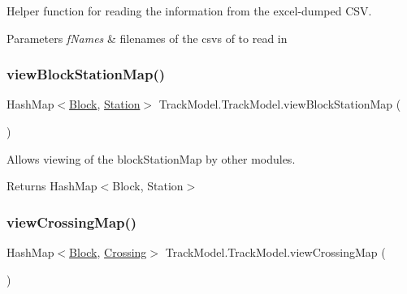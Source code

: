 Helper function for reading the information from the excel-\/dumped C\+SV. 


\begin{DoxyParams}{Parameters}
{\em f\+Names} & filenames of the csv\textquotesingle{}s of to read in \\
\hline
\end{DoxyParams}
\mbox{\label{classTrackModel_1_1TrackModel_a5bd341c8df3e0ad585f32e1587061f36}} 
\subsubsection{\texorpdfstring{view\+Block\+Station\+Map()}{viewBlockStationMap()}}
{\footnotesize\ttfamily Hash\+Map$<$\hyperlink{classTrackModel_1_1Block}{Block}, \hyperlink{classTrackModel_1_1Station}{Station}$>$ Track\+Model.\+Track\+Model.\+view\+Block\+Station\+Map (\begin{DoxyParamCaption}{ }\end{DoxyParamCaption})}



Allows viewing of the block\+Station\+Map by other modules. 

\begin{DoxyReturn}{Returns}
Hash\+Map$<$\+Block, Station$>$ 
\end{DoxyReturn}
\mbox{\label{classTrackModel_1_1TrackModel_a5f9d06be603a4aee4d29da60276b0383}} 
\subsubsection{\texorpdfstring{view\+Crossing\+Map()}{viewCrossingMap()}}
{\footnotesize\ttfamily Hash\+Map$<$\hyperlink{classTrackModel_1_1Block}{Block}, \hyperlink{classTrackModel_1_1Crossing}{Crossing}$>$ Track\+Model.\+Track\+Model.\+view\+Crossing\+Map (\begin{DoxyParamCaption}{ }\end{DoxyParamCaption})}

